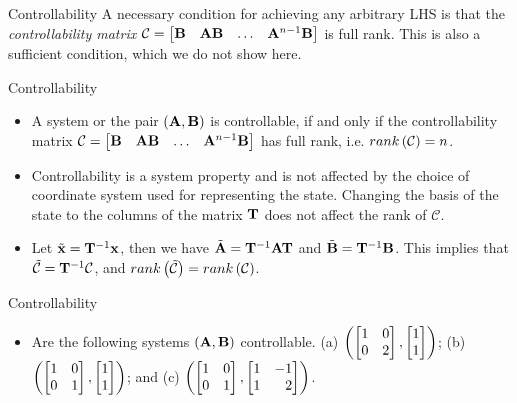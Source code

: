\documentclass[aspectratio=169]{beamer}
\def\mf{\ensuremath\mathbf}
\def\lp{\ensuremath\left(}
\def\rp{\ensuremath\right)}
\def\bmx{\ensuremath\begin{bmatrix*}[r]}
\def\emx{\ensuremath\end{bmatrix*}}
\newcommand{\ct}[1]{\lp #1\rp}
\begin{document}
\begin{frame}{Controllability}
A necessary condition for achieving any arbitrary LHS is that the \textit{controllability matrix} $\mathcal{C} = \bmx \mf{B} & \mf{A}\mf{B} & \ldots & \mf{A}^{n-1}\mf{B} \emx$ is full rank. This is also a sufficient condition, which we do not show here.
\end{frame}


\begin{frame}[t]{Controllability}
\begin{itemize}
    \item A system or the pair $\ct{\mf{A}, \mf{B}}$ is controllable, if and only if the controllability matrix $\mathcal{C} = \bmx \mf{B} & \mf{A}\mf{B} & \ldots & \mf{A}^{n-1}\mf{B} \emx$ has full rank, i.e. $rank\ct{\mathcal{C}} = n$.

    \item Controllability is a system property and is not affected by the choice of coordinate system used for representing the state. Changing the basis of the state to the columns of the matrix $\mf{T}$ does not affect the rank of $\mathcal{C}$.

    \item Let $\tilde{\mf{x}} = \mf{T}^{-1}\mf{x}$, then we have $\tilde{\mf{A}} = \mf{T}^{-1}\mf{A}\mf{T}$ and $\tilde{\mf{B}} = \mf{T}^{-1}\mf{B}$. This implies that $\tilde{\mathcal{C}} = \mf{T}^{-1}\mathcal{C}$,  and $rank\ct{\tilde{\mathcal{C}}} = rank\ct{\mathcal{C}}$.
\end{itemize}
\end{frame}


\begin{frame}[t]{Controllability}
\begin{itemize}
    \item Are the following systems $\ct{\mf{A}, \mf{B}}$ controllable. (a) $\ct{\bmx 1 & 0 \\ 0 & 2 \emx, \bmx 1 \\ 1\emx}$; (b) $\ct{\bmx 1 & 0 \\ 0 & 1 \emx, \bmx 1 \\ 1\emx}$; and (c) $\ct{\bmx 1 & 0 \\ 0 & 1 \emx, \bmx 1 & -1\\ 1 & 2\emx}$.
\end{itemize}
\end{frame}
 
\end{document}
